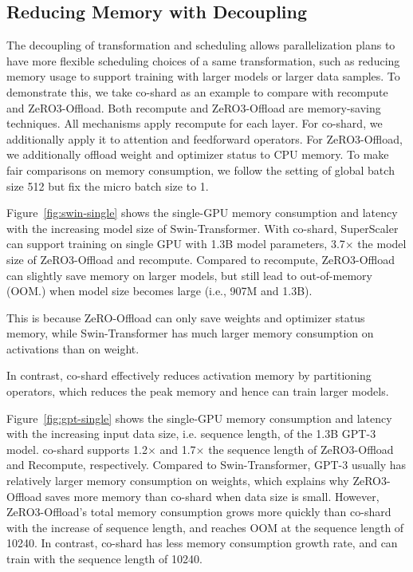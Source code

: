 \subsection{Reducing Memory with Decoupling}
\label{sec:eval-decouple}

The decoupling of transformation and scheduling allows parallelization plans to have more flexible scheduling choices of a same transformation, such as reducing memory usage to support training with larger models or larger data samples. To demonstrate this, we take {co-shard} as an example to compare with recompute and ZeRO3-Offload. Both recompute and ZeRO3-Offload are memory-saving techniques. All mechanisms apply recompute for each layer. For {co-shard}, we additionally apply it to attention and feedforward operators. For ZeRO3-Offload, we additionally offload weight and optimizer status to CPU memory. To make fair comparisons on memory consumption, we follow the setting of global batch size 512 but fix the micro batch size to 1.

Figure~\ref{fig:swin-single} shows the single-GPU memory consumption and latency with the increasing model size of Swin-Transformer. With {co-shard}, {SuperScaler} can support training on single GPU with 1.3B model parameters, 3.7$\times$ the model size of ZeRO3-Offload and recompute. Compared to recompute, ZeRO3-Offload can slightly save memory on larger models, but still lead to out-of-memory (OOM.) when model size becomes large (i.e., 907M and 1.3B).

This is because ZeRO-Offload can only save weights and optimizer status memory, while Swin-Transformer has much larger memory consumption on activations than on weight.

In contrast, {co-shard} effectively reduces activation memory by partitioning operators, which reduces the peak memory and hence can train larger models. 

Figure~\ref{fig:gpt-single} shows the single-GPU memory consumption and latency with the increasing input data size, i.e. sequence length, of the 1.3B GPT-3 model. {co-shard} supports 1.2$\times$ and 1.7$\times$ the sequence length of ZeRO3-Offload and Recompute, respectively. Compared to Swin-Transformer, GPT-3 usually has relatively larger memory consumption on weights, which explains why ZeRO3-Offload saves more memory than {co-shard} when data size is small. However, ZeRO3-Offload's total memory consumption grows more quickly than {co-shard} with the increase of sequence length, and reaches OOM at the sequence length of 10240. In contrast, {co-shard} has less memory consumption growth rate, and can train with the sequence length of 10240. 

